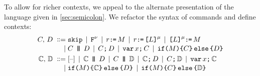 To allow for richer contexts, we appeal to the alternate presentation of the
language given in \textsection\ref{sec:semicolon}.  We refactor the syntax
of commands and define contexts:
\begin{align*}
  \aCmd,\,\bCmd
  \BNFDEF& \SKIP
  \mkern-2mu\BNFSEP\mkern-2mu \FENCE^{\fmode}
  \mkern-2mu\BNFSEP\mkern-2mu \aReg\GETS\aExp
  \mkern-2mu\BNFSEP\mkern-2mu \aReg\GETS \REF{\cExp}^{\amode} 
  \mkern-2mu\BNFSEP\mkern-2mu \REF{\cExp}^{\amode}\GETS\aExp
  \\[-.5ex]
  \BNFSEP&\aCmd \PAR \bCmd
  \mkern-2mu\BNFSEP\mkern-2mu\aCmd \SEMI \bCmd
  \mkern-2mu\BNFSEP\mkern-2mu \VAR\aLoc\SEMI \aCmd
  \mkern-2mu\BNFSEP\mkern-2mu \IF{\aExp} \THEN \aCmd \ELSE \bCmd \FI
  \\
  \aCtxt,\,\bCtxt
  \BNFDEF& \hole{}
  \mkern-2mu\BNFSEP\mkern-2mu \aCtxt \PAR \bCmd
  \mkern-2mu\BNFSEP\mkern-2mu \aCmd \PAR \bCtxt
  \mkern-2mu\BNFSEP\mkern-2mu \aCtxt \SEMI \bCmd
  \mkern-2mu\BNFSEP\mkern-2mu \aCmd \SEMI \bCtxt
  \mkern-2mu\BNFSEP\mkern-2mu \VAR\aLoc\SEMI \aCtxt
  \\[-.5ex]
  \BNFSEP& \IF{\aExp} \THEN \aCtxt \ELSE \bCmd \FI
  \mkern-2mu\BNFSEP\mkern-2mu \IF{\aExp} \THEN \aCmd \ELSE \bCtxt \FI
\end{align*}


